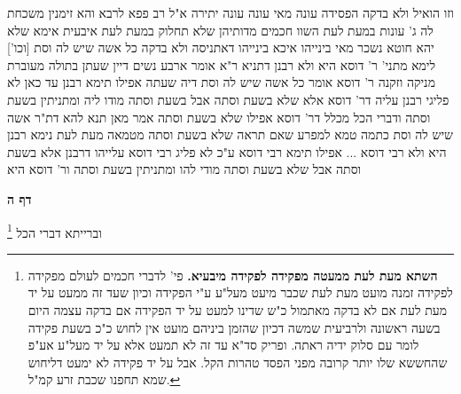 \documentclass[12pt, openany]{book}
\newcommand{\sethebfont}{
\fontsize{10.5pt}{21.0pt} \selectfont
}
\newcommand{\twocol}[1]{
	{\sethebfont \begin{multicols}{2}
			#1
	\end{multicols}}	
}
\newcommand{\sectname}{}
\newcommand{\newsection}[1]{
	\addcontentsline{toc}{section}{#1}
	\renewcommand{\sectname}{#1}	
	\vspace{-\baselineskip}
	\begin{center}
		\textbf{%
\fontsize{16pt}{16pt}\selectfont
			#1}
	\end{center}
	\vspace{-\baselineskip}
	\nopagebreak
}
\newcommand{\footnotecomment}[1]{\footnote{#1}}
\newcommand{\commenta}[1]{\footnotecomment{#1}}
\begin{document}
{וזו הואיל ולא בדקה הפסידה עונה  מאי עונה  עונה יתירה 
א"ל רב פפא לרבא  והא זימנין משכחת לה ג' עונות במעת לעת  השוו חכמים מדותיהן שלא תחלוק במעת לעת 
איבעית אימא  שלא יהא חוטא נשכר 
מאי בינייהו  איכא בינייהו  דאתניסה ולא בדקה
כל אשה שיש לה וסת [וכו'] לימא מתני' ר' דוסא היא ולא רבנן דתניא ר"א אומר  ארבע נשים דיין שעתן בתולה מעוברת מניקה וזקנה  ר' דוסא אומר  כל אשה שיש לה וסת דיה שעתה 
אפילו תימא רבנן עד כאן לא פליגי רבנן עליה דר' דוסא אלא שלא בשעת וסתה אבל בשעת וסתה מודו ליה ומתניתין בשעת וסתה ודברי הכל 
מכלל דר' דוסא אפילו שלא בשעת וסתה אמר  מאן תנא להא דת"ר  אשה שיש לה וסת כתמה טמא למפרע שאם תראה שלא בשעת וסתה מטמאה מעת לעת
נימא רבנן היא ולא רבי דוסא ... אפילו תימא רבי דוסא ע"כ לא פליג רבי דוסא עלייהו דרבנן אלא בשעת וסתה אבל שלא בשעת וסתה מודי להו  ומתניתין בשעת וסתה ור' דוסא היא}

\newsection{דף ה}
\twocol{וברייתא דברי הכל 
\commenta{\textbf{השתא מעת לעת ממעטה מפקידה לפקידה מיבעיא.}  פי' לדברי חכמים לעולם מפקידה לפקידה זמנה מועט מעת לעת שכבר מיעט מעל"ע ע"י הפקידה וכיון שעד זה ממעט על יד מעת לעת אם לא בדקה מאתמול כ"ש שדינו למעט על יד הפקידה אם בדקה עצמה היום בשעה ראשונה ולרביעית שמשה דכיון שהזמן ביניהם מועט אין לחוש כ"כ בשעת פקידה לומר עם סלוק ידיה ראתה. ופריק סד"א עד זה לא תמעט אלא על יד מעל"ע אע"פ שהחששא שלו יותר קרובה מפני הפסד טהרות הקל. אבל על יד פקידה לא ימעט דליחוש שמא תחפנו שכבת זרע קמ"ל. }

}
\end{document}
